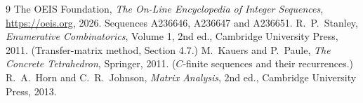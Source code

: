 \documentclass[11pt,a4paper]{article}
\theoremstyle{plain}
\theoremstyle{definition}
\begin{document}
\begin{thebibliography}{9}
 The OEIS Foundation, \emph{The On-Line Encyclopedia of Integer
Sequences}, \url{https://oeis.org}, 2026. Sequences A236646, A236647 and A236651.
 R.~P.~Stanley, \emph{Enumerative Combinatorics}, Volume 1, 2nd ed.,
Cambridge University Press, 2011. (Transfer-matrix method, Section 4.7.)
 M.~Kauers and P.~Paule, \emph{The Concrete Tetrahedron}, Springer, 2011.
($C$-finite sequences and their recurrences.)
 R.~A.~Horn and C.~R.~Johnson, \emph{Matrix Analysis}, 2nd ed., Cambridge
University Press, 2013.
\end{thebibliography}
\end{document}

